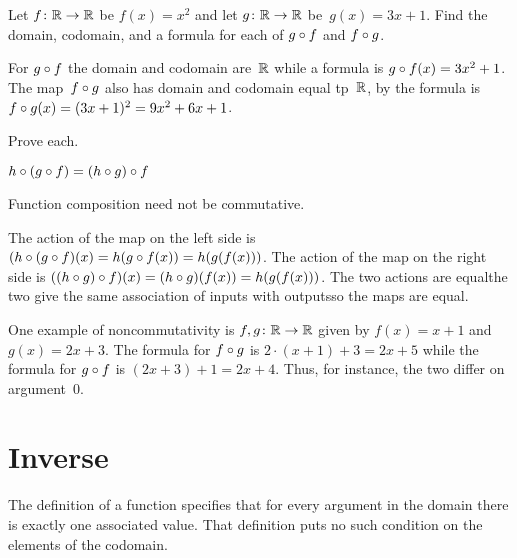 \documentclass{ibl}  %
\begin{document}
\begin{ex}
Let $\mbox{$f\colon \mathbb{R}\to \mathbb{R}$}$ be $f(x)=x^2$ and let $\mbox{$g\colon \mathbb{R}\to \mathbb{R}$}$ be~$g(x)=3x+1$.
Find the domain, codomain, and a formula for each of
$g\mathbin{\circ} f$ and $f\mathbin{\circ} g$.  
\begin{ans}
For $g\mathbin{\circ} f$ the domain and codomain are~$\mathbb{R}$ while a formula is
$g\mathbin{\circ} f(x)=3x^2+1$.
The map~$f\mathbin{\circ} g$ also has domain and codomain equal tp~$\mathbb{R}$,
by the formula is~$f\mathbin{\circ} g(x)=(3x+1)^2=9x^2+6x+1$.
\end{ans}
\end{ex}

\begin{ex} Prove each.
\begin{exes}
\item{} 
  $h\mathbin{\circ} (g\mathbin{\circ} f)=(h\mathbin{\circ} g)\mathbin{\circ} f$    
\item Function composition need not be commutative.
\end{exes}
\begin{ans}
\begin{exes}
\item The action of the map on the left side
  is $(h\mathbin{\circ} (g\mathbin{\circ} f)(x)=h(g\mathbin{\circ} f(x))
       =h(g(f(x)))$.
  The action of the map on the right side  
  is $((h\mathbin{\circ} g)\mathbin{\circ} f)(x)=(h\mathbin{\circ} g)(f(x))
      =h(g(f(x)))$.
  The two actions are equal\Dash the two give the same association of inputs
  with outputs\Dash so the maps are equal.
\item One example of noncommutativity is $\mbox{$f,g\colon \mathbb{R}\to \mathbb{R}$}$ given by 
  $f(x)=x+1$ and $g(x)=2x+3$.
  The formula for $f\mathbin{\circ} g$ is $2\cdot(x+1)+3=2x+5$ while
  the formula for $g\mathbin{\circ} f$ is $(2x+3)+1=2x+4$.
  Thus, for instance, the two differ on argument~$0$.
\end{exes}
\end{ans}
\end{ex}





\section{Inverse}

The definition of a function specifies that for every argument in the
domain there is 
exactly one associated value.
That definition puts no such condition on the elements of the codomain.
\end{document}
